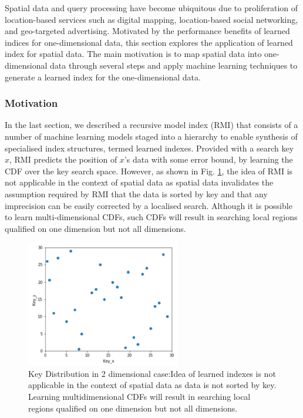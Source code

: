 Spatial data and query processing have become ubiquitous due to proliferation of location-based services such as digital mapping, location-based social networking,
and geo-targeted advertising. Motivated by the performance benefits of learned indices
for one-dimensional data, this section explores the application of learned index for spatial data. The main motivation is to map spatial data into one-dimensional data through several steps and apply machine learning techniques to generate a learned index for the one-dimensional data.

\subsubsection{Motivation}

In the last section, we described a recursive model index (RMI) that consists of a number of machine learning models staged into a hierarchy to enable synthesis of specialised index structures, termed learned indexes. Provided with a search key $x$, RMI predicts the position of $x$'s data with some error bound, by learning the CDF over the key search space. However, as shown in Fig.  \ref{fig:Key_Distribution}, the idea of RMI is not applicable in the context of spatial data as spatial data invalidates the assumption required by RMI that the data is sorted by key and that any imprecision can be easily corrected by a localised search. Although it is possible to learn multi-dimensional CDFs, such CDFs will result in searching local regions qualified on one dimension but not all dimensions.

\begin{figure}[t]
    \centering
    \includegraphics[width=0.6\textwidth]{graphs/Lisa_Key_distribution.png}
    \caption{Key Distribution in 2 dimensional case:Idea of learned indexes is not applicable in the context of spatial data as data is not sorted by key. Learning multidimensional CDFs will result in searching local regions qualified on one dimension but not all dimensions.}
    \label{fig:Key_Distribution}
\end{figure}

